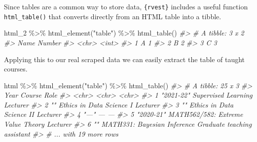 \documentclass[
  12pt,
]{book}
\newenvironment{Shaded}{\begin{snugshade}}{\end{snugshade}}
\newcommand{\CommentTok}[1]{\textcolor[rgb]{0.56,0.35,0.01}{\textit{#1}}}
\newcommand{\FunctionTok}[1]{\textcolor[rgb]{0.00,0.00,0.00}{#1}}
\newcommand{\NormalTok}[1]{#1}
\newcommand{\SpecialCharTok}[1]{\textcolor[rgb]{0.00,0.00,0.00}{#1}}
\newcommand{\StringTok}[1]{\textcolor[rgb]{0.31,0.60,0.02}{#1}}
\begin{document}
Since tables are a common way to store data, \texttt{\{rvest\}} includes a useful function \texttt{html\_table()} that converts directly from an HTML table into a tibble.

\begin{Shaded}
\begin{Highlighting}[]
\NormalTok{html\_2 }\SpecialCharTok{\%\textgreater{}\%} 
  \FunctionTok{html\_element}\NormalTok{(}\StringTok{"table"}\NormalTok{) }\SpecialCharTok{\%\textgreater{}\%} 
  \FunctionTok{html\_table}\NormalTok{()}
\CommentTok{\#\textgreater{} \# A tibble: 3 x 2}
\CommentTok{\#\textgreater{}   Name  Number}
\CommentTok{\#\textgreater{}   \textless{}chr\textgreater{}  \textless{}int\textgreater{}}
\CommentTok{\#\textgreater{} 1 A          1}
\CommentTok{\#\textgreater{} 2 B          2}
\CommentTok{\#\textgreater{} 3 C          3}
\end{Highlighting}
\end{Shaded}

Applying this to our real scraped data we can easily extract the table of taught courses.

\begin{Shaded}
\begin{Highlighting}[]
\NormalTok{html }\SpecialCharTok{\%\textgreater{}\%} 
  \FunctionTok{html\_element}\NormalTok{(}\StringTok{"table"}\NormalTok{) }\SpecialCharTok{\%\textgreater{}\%} 
  \FunctionTok{html\_table}\NormalTok{()}
\CommentTok{\#\textgreater{} \# A tibble: 25 x 3}
\CommentTok{\#\textgreater{}   Year      Course                            Role                       }
\CommentTok{\#\textgreater{}   \textless{}chr\textgreater{}     \textless{}chr\textgreater{}                             \textless{}chr\textgreater{}                      }
\CommentTok{\#\textgreater{} 1 "2021{-}22" Supervised Learning               Lecturer                   }
\CommentTok{\#\textgreater{} 2 ""        Ethics in Data Science I          Lecturer                   }
\CommentTok{\#\textgreater{} 3 ""        Ethics in Data Science II         Lecturer                   }
\CommentTok{\#\textgreater{} 4 "—"       —                                 —                          }
\CommentTok{\#\textgreater{} 5 "2020{-}21" MATH562/582: Extreme Value Theory Lecturer                   }
\CommentTok{\#\textgreater{} 6 ""        MATH331: Bayesian Inference       Graduate teaching assistant}
\CommentTok{\#\textgreater{} \# ... with 19 more rows}
\end{Highlighting}
\end{Shaded}
\end{document}
